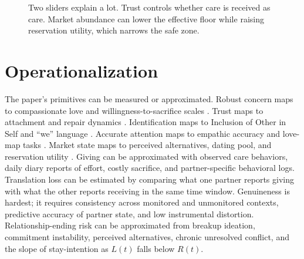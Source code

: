 \documentclass[11pt]{article}
\begin{document}
\begin{figure}[ht]
\centering
{}
\hfill
{}
\caption{Two sliders explain a lot. Trust controls whether care is received as care. Market abundance can lower the effective floor while raising reservation utility, which narrows the safe zone.}
\label{fig:trust-market}
\end{figure}

\section{Operationalization}
The paper's primitives can be measured or approximated. Robust concern maps to compassionate love and willingness-to-sacrifice scales \citep{sprecher2005,rusbult1998}. Trust maps to attachment and repair dynamics \citep{mikulincer2007,gottman1999}. Identification maps to Inclusion of Other in Self and ``we'' language \citep{aron1992,pennebaker2011}. Accurate attention maps to empathic accuracy and love-map tasks \citep{ickes1997,gottman1999}. Market state maps to perceived alternatives, dating pool, and reservation utility \citep{rusbult1998,rosenfeld2019}. Giving can be approximated with observed care behaviors, daily diary reports of effort, costly sacrifice, and partner-specific behavioral logs. Translation loss can be estimated by comparing what one partner reports giving with what the other reports receiving in the same time window. Genuineness is hardest; it requires consistency across monitored and unmonitored contexts, predictive accuracy of partner state, and low instrumental distortion. Relationship-ending risk can be approximated from breakup ideation, commitment instability, perceived alternatives, chronic unresolved conflict, and the slope of stay-intention as $L(t)$ falls below $R(t)$.
\end{document}
